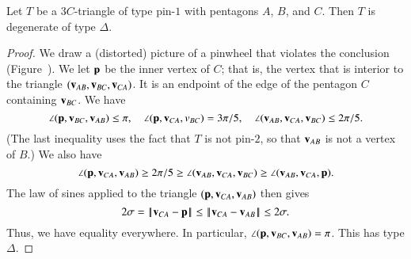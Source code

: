 
\begin{lemma} Let $T$ be a $3C$-triangle of type pin-$1$ with
  pentagons $A$, $B$, and $C$.  Then $T$ is degenerate of type
  $\Delta$.
\end{lemma}


\begin{proof}  We draw a (distorted) picture of a
  pinwheel that violates the conclusion (Figure~).
  We let ${\mathbf p}$ be the inner vertex of $C$; that is, the vertex that is
  interior to the triangle $({\mathbf v}_{AB},{\mathbf v}_{BC},{\mathbf v}_{CA})$.  It is an
  endpoint of the edge of the pentagon $C$ containing ${\mathbf v}_{BC}$.  We have
\[
\angle ({\mathbf p},{\mathbf v}_{BC},{\mathbf v}_{AB}) \le \pi,\quad 
\angle({\mathbf p},{\mathbf v}_{CA},v_{BC}) = 3\pi/5,\quad
\angle({\mathbf v}_{AB},{\mathbf v}_{CA},{\mathbf v}_{BC})\le 2\pi/5.
\]
(The last inequality uses the fact that $T$ is not pin-$2$, so
that ${\mathbf v}_{AB}$ is not a vertex of $B$.)
We also have
\[
\angle({\mathbf p},{\mathbf v}_{CA},{\mathbf v}_{AB}) \ge 2\pi /5 
\ge \angle({\mathbf v}_{AB},{\mathbf v}_{CA},{\mathbf v}_{BC}) \ge \angle({\mathbf v}_{AB},{\mathbf v}_{CA},{\mathbf p}).
\]
The law of sines applied to the triangle $({\mathbf p},{\mathbf v}_{CA},{\mathbf v}_{AB})$ then gives
\[
2\sigma =\norm{\v_{CA}}{\p}\le\norm{\v_{CA}}{\v_{AB}}\le 2\sigma.
\]
Thus, we have equality everywhere.  In particular,
$\angle({\mathbf p},{\mathbf v}_{BC},{\mathbf v}_{AB})=\pi$.  This has type $\Delta$.
\end{proof}

